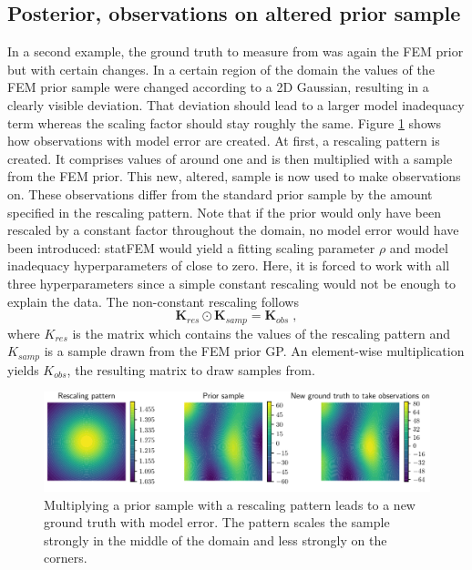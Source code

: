 \documentclass[%
  a4paper,oneside,%
  11pt,%
  smallchapters,
  style=printdev,
  extramargin,
  green,%
  rgb, <cmyk>
  ]{tubsbook}
\begin{document}
\subsection{Posterior, observations on altered prior sample}
\label{sec:PostModErr}
In a second example, the ground truth to measure from was again the FEM prior but with certain changes. In a certain region of the domain the values of the FEM prior sample were changed according to a 2D Gaussian, resulting in a clearly visible deviation. That deviation should lead to a larger model inadequacy term whereas the scaling factor should stay roughly the same. Figure \ref{fig:ObsPat} shows how observations with model error are created. At first, a rescaling pattern is created. It comprises values of around one and is then multiplied with a sample from the FEM prior. This new, altered, sample is now used to make observations on. These observations differ from the standard prior sample by the amount specified in the rescaling pattern. Note that if the prior would only have been rescaled by a constant factor throughout the domain, no model error would have been introduced: statFEM would yield a fitting scaling parameter $\rho$ and model inadequacy hyperparameters of close to zero. Here, it is forced to work with all three hyperparameters since a simple constant rescaling would not be enough to explain the data. The non-constant rescaling follows
\begin{equation}
\bm{K}_{res} \odot \bm{K}_{samp} = \bm{K}_{obs} \;,
\end{equation}
where $K_{res}$ is the matrix which contains the values of the rescaling pattern and $K_{samp}$ is a sample drawn from the FEM prior GP. An element-wise multiplication yields $K_{obs}$, the resulting matrix to draw samples from.
\begin{figure}[!ht]
\includegraphics[width=1\textwidth]{pics/ObsPattern.pdf}
\centering
\caption[Illustration of the ground truth with model error]{Multiplying a prior sample with a rescaling pattern leads to a new ground truth with model error. The pattern scales the sample strongly in the middle of the domain and less strongly on the corners.}
\label{fig:ObsPat}
\end{figure}
\end{document}
